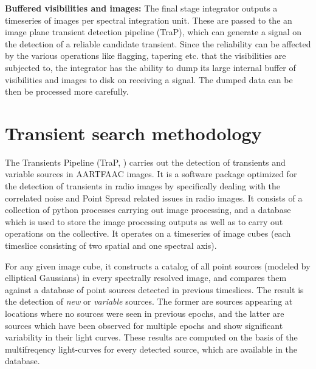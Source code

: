 \documentclass{ws-jai}
\begin{document}
\noindent \textbf {Buffered visibilities and images:} The final stage integrator
outputs a timeseries  of images per spectral integration unit.  These are passed
to the an image plane transient  detection pipeline (TraP), which can generate a
signal on the detection of a reliable candidate transient. Since the reliability
can be affected by the various operations like flagging, tapering etc.  that the
visibilities are subjected to, the integrator  has the ability to dump its large
internal buffer  of visibilities and images  to disk on receiving  a signal. The
dumped data can be then be processed more carefully.\\


\section {\label{sec:trap} Transient search methodology}
The  Transients  Pipeline  (TraP,  \citep{swinbank2015lofar})  carries  out  the
detection  of transients  and  variable sources  in AARTFAAC  images.   It is  a
software package  optimized for the detection  of transients in radio  images by
specifically dealing with  the correlated noise and Point  Spread related issues
in radio  images. It consists of  a collection of python  processes carrying out
image processing,  and a database  which is used  to store the  image processing
outputs as well as to carry out  operations on the collective.  It operates on a
timeseries of  image cubes  (each timeslice  consisting of  two spatial  and one
spectral axis). 

For any given image cube, it constructs  a catalog of all point sources (modeled
by elliptical Gaussians)  in every spectrally resolved image,  and compares them
against a database of point sources detected in previous timeslices.  The result
is the detection  of \textit{new} or \textit{variable} sources.   The former are
sources appearing  at locations where no  sources were seen in  previous epochs,
and the latter are sources which have been observed for multiple epochs and show
significant variability in their light curves. These results are computed on the
basis of  the multifreqency  light-curves for every  detected source,  which are
available in the database.
\end{document}

